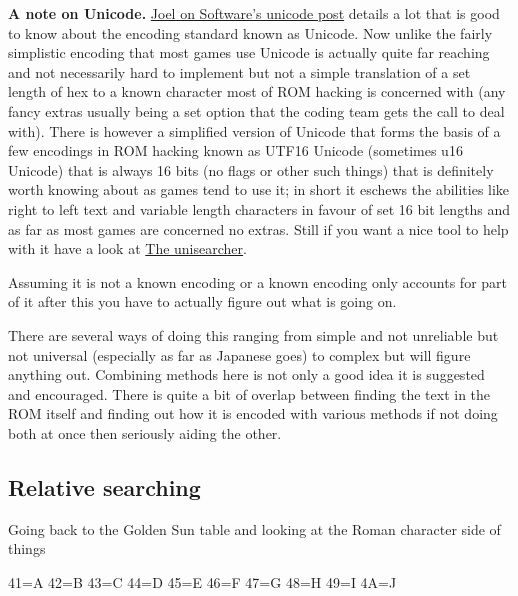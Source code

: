 \documentclass[
]{book}
\newenvironment{Shaded}{\begin{snugshade}}{\end{snugshade}}
\newcommand{\DecValTok}[1]{\textcolor[rgb]{0.00,0.00,0.81}{#1}}
\newcommand{\NormalTok}[1]{#1}
\newcommand{\OtherTok}[1]{\textcolor[rgb]{0.56,0.35,0.01}{#1}}
\begin{document}
\textbf{A note on Unicode.} \href{http://www.joelonsoftware.com/articles/Unicode.html}{Joel on Software's unicode post} details a lot that is good to know about the encoding standard known as Unicode. Now unlike the fairly simplistic encoding that most games use Unicode is actually quite far reaching and not necessarily hard to implement but not a simple translation of a set length of hex to a known character most of ROM hacking is concerned with (any fancy extras usually being a set option that the coding team gets the call to deal with). There is however a simplified version of Unicode that forms the basis of a few encodings in ROM hacking known as UTF16 Unicode (sometimes u16 Unicode) that is always 16 bits (no flags or other such things) that is definitely worth knowing about as games tend to use it; in short it eschews the abilities like right to left text and variable length characters in favour of set 16 bit lengths and as far as most games are concerned no extras. Still if you want a nice tool to help with it have a look at \href{http://www.isthisthingon.org/unicode/index.phtml}{The unisearcher}.

Assuming it is not a known encoding or a known encoding only accounts for part of it after this you have to actually figure out what is going on.

There are several ways of doing this ranging from simple and not unreliable but not universal (especially as far as Japanese goes) to complex but will figure anything out. Combining methods here is not only a good idea it is suggested and encouraged. There is quite a bit of overlap between finding the text in the ROM itself and finding out how it is encoded with various methods if not doing both at once then seriously aiding the other.

\hypertarget{relative-searching}{%
\subsection{Relative searching}\label{relative-searching}}

Going back to the Golden Sun table and looking at the Roman character side of things

\begin{Shaded}
\begin{Highlighting}[]
\DecValTok{41}\OtherTok{=}\NormalTok{A}
\DecValTok{42}\OtherTok{=}\NormalTok{B}
\DecValTok{43}\OtherTok{=}\NormalTok{C}
\DecValTok{44}\OtherTok{=}\NormalTok{D}
\DecValTok{45}\OtherTok{=}\NormalTok{E}
\DecValTok{46}\OtherTok{=}\NormalTok{F}
\DecValTok{47}\OtherTok{=}\NormalTok{G}
\DecValTok{48}\OtherTok{=}\NormalTok{H}
\DecValTok{49}\OtherTok{=}\NormalTok{I}
\NormalTok{4A}\OtherTok{=}\NormalTok{J}
\end{Highlighting}
\end{Shaded}
\end{document}
